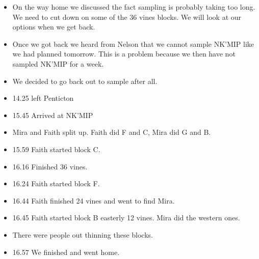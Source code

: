 \documentclass[11pt,letter]{article}
\newenvironment{smitemize}{
\begin{itemize}
  \setlength{\itemsep}{0pt}
  \setlength{\parskip}{0.8pt}
  \setlength{\parsep}{0pt}}
{\end{itemize}
}
\begin{document}
\begin{smitemize}
\item On the way home we discussed the fact sampling is probably taking too long. We need to cut down on some of the 36 vines blocks. We will look at our options when we get back. 
\item Once we got back we heard from Nelson that we cannot sample NK'MIP like we had planned tomorrow. This is a problem because we then have not sampled NK'MIP for a week. 
\item We decided to go back out to sample after all. 
\item 14.25 left Penticton
\item 15.45 Arrived at NK'MIP
\item Mira and Faith split up. Faith did F and C, Mira did G and B.
\item 15.59 Faith started block C.
\item 16.16 Finished 36 vines.
\item 16.24 Faith started block F.
\item 16.44 Faith finished 24 vines and went to find Mira.
\item 16.45 Faith started block B easterly 12 vines. Mira did the western ones. 
\item There were people out thinning these blocks. 
\item 16.57 We finished and went home. 
  
\end{smitemize}
\end{document}
